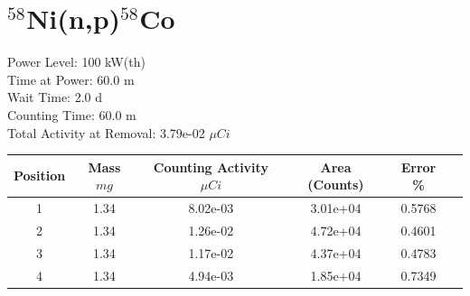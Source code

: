 \newpage

\section*{ $^{58}$Ni(n,p)$^{58}$Co }

Power Level: 100 kW(th) \\
Time at Power: 60.0 m \\
Wait Time:  2.0 d \\
Counting Time: 60.0 m \\
Total Activity at Removal: 3.79e-02 $\mu Ci$

\begin{table}[h]
\centering
\begin{tabular}{ |c|c|c|c|c|c| }
 \hline
 Position & Mass $mg$ & Counting Activity $\mu Ci$ & Area (Counts) & Error \% \\
 \hline 
 1 & 1.34 & 8.02e-03 & 3.01e+04 & 0.5768 \\ 
\hline
 2 & 1.34 & 1.26e-02 & 4.72e+04 & 0.4601 \\ 
\hline
 3 & 1.34 & 1.17e-02 & 4.37e+04 & 0.4783 \\ 
\hline
 4 & 1.34 & 4.94e-03 & 1.85e+04 & 0.7349 \\ 
\hline
\end{tabular}
\end{table}

